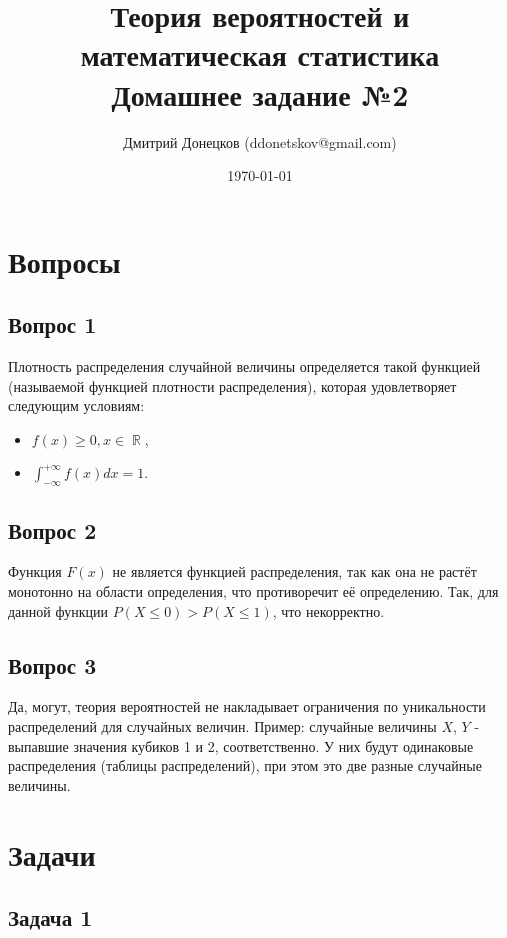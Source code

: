 \documentclass[a4paper,11pt]{article}
\title{\vspace{-1.5cm}Теория вероятностей и математическая статистика \\
Домашнее задание №2}
\author{Дмитрий Донецков (ddonetskov@gmail.com)}
\date{\today}
\DeclareMathOperator*{\R}{\mathbb{R}}   %
\begin{document}
\maketitle

\section{Вопросы}

\subsection{Вопрос 1}

Плотность распределения случайной величины определяется такой функцией (называемой функцией плотности распределения), которая удовлетворяет следующим условиям:

\begin{itemize}
\item $f(x) \geq 0, x \in \R$,
\item $\int_{-\infty}^{+\infty}f(x)dx = 1$.
\end{itemize}

\subsection{Вопрос 2}

Функция $F(x)$ не является функцией распределения, так как она не растёт монотонно на области определения, что противоречит её определению. Так, для данной функции $P(X \leq 0) > P(X \leq 1)$, что некорректно.

\subsection{Вопрос 3}

Да, могут, теория вероятностей не накладывает ограничения по уникальности распределений для случайных величин. Пример: случайные величины $X$, $Y$ - выпавшие значения кубиков 1 и 2, соответственно. У них будут одинаковые распределения (таблицы распределений), при этом это две разные случайные величины.

\section{Задачи}

\subsection{Задача 1}
\end{document}
